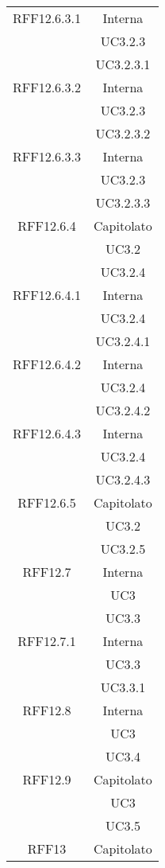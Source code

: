 \begin{longtable}{|c|c|}
\midrule
RFF12.6.3.1
& Interna\\
& UC3.2.3\\
& UC3.2.3.1\\

\midrule
RFF12.6.3.2
& Interna\\
& UC3.2.3\\
& UC3.2.3.2\\

\midrule
RFF12.6.3.3
& Interna\\
& UC3.2.3\\
& UC3.2.3.3\\

\midrule
RFF12.6.4
& Capitolato\\
& UC3.2\\
& UC3.2.4\\

\midrule
RFF12.6.4.1
& Interna\\
& UC3.2.4\\
& UC3.2.4.1\\

\midrule
RFF12.6.4.2
& Interna\\
& UC3.2.4\\
& UC3.2.4.2\\

\midrule
RFF12.6.4.3
& Interna\\
& UC3.2.4\\
& UC3.2.4.3\\

\midrule
RFF12.6.5
& Capitolato\\
& UC3.2\\
& UC3.2.5\\

\midrule
RFF12.7
& Interna\\
& UC3\\
& UC3.3\\

\midrule
RFF12.7.1
& Interna\\
& UC3.3\\
& UC3.3.1\\

\midrule
RFF12.8
& Interna\\
& UC3\\
& UC3.4\\

\midrule
RFF12.9
& Capitolato\\
& UC3\\
& UC3.5\\

\midrule
RFF13
& Capitolato\\


\end{longtable}
